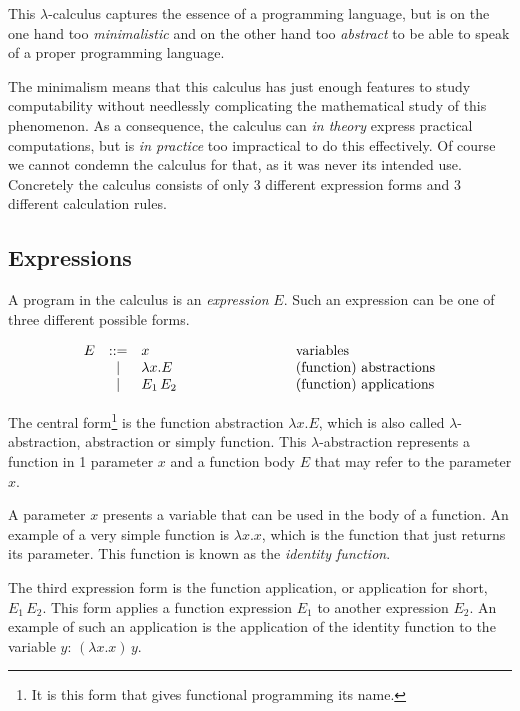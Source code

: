 This $\lambda$-calculus captures the essence of a programming language, but
is on the one hand too \emph{minimalistic} and on the other hand too \emph{abstract}
to be able to speak of a proper programming language.

The minimalism means that this calculus has just enough features to study
computability without needlessly complicating the mathematical study of this
phenomenon. As a consequence, the calculus can \emph{in theory} express practical
computations, but is \emph{in practice} too impractical to do this effectively. 
Of course we cannot condemn the calculus for that, as it was never
its intended use. Concretely the calculus consists of only 3 different expression
forms and 3 different calculation rules.

\subsection{Expressions}

A program in the calculus is an \emph{expression} $E$. Such an expression 
can be one of three different possible forms.
\begin{framed}
\begin{equation*}
\begin{array}{rcl@{\hspace{3cm}}l}
E & ::=  & x                    & \text{variables}\\
  & \mid & \lambda x.E          & \text{(function) abstractions} \\
  & \mid & E_1\,E_2             & \text{(function) applications}
\end{array}
\end{equation*}
\end{framed}

The central form\footnote{It is this form that gives functional
programming its name.} is the function abstraction $\lambda x.E$, which is
also called 
$\lambda$-abstraction, abstraction or simply function. This
$\lambda$-abstraction represents a function in 1 parameter $x$ and a function body
$E$ that may refer to the parameter $x$.  

A parameter $x$ presents a variable that can be used in the body of a function.
An example of a very simple function is $\lambda x.x$,
which is the function that just returns its parameter. This function
is known as the \emph{identity function}.

The third expression form is the function application, or application for short,
$E_1\,E_2$. This form applies a function expression $E_1$ to another expression
$E_2$. An example of such an application is the application of the identity function
to the variable $y$: $(\lambda x.x)\,y$.

